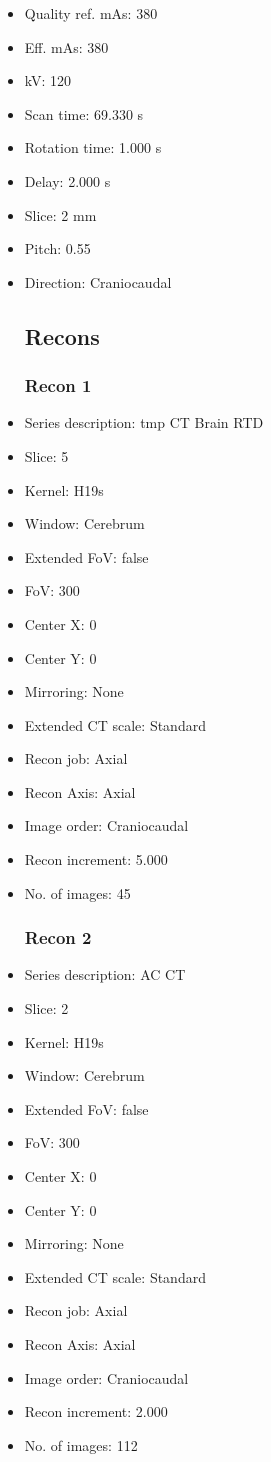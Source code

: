 \documentclass[12pt]{article}
\begin{document}
\begin{itemize}
\subsection{Scan}
\item Quality ref. mAs: 380\item Eff. mAs: 380\item kV: 120\item Scan time: 69.330 s\item Rotation time: 1.000 s\item Delay: 2.000 s\item Slice: 2 mm\item Pitch: 0.55\item Direction: Craniocaudal\subsection{Recons}

\subsubsection{Recon 1}
\item Series description: tmp CT Brain RTD
\item Slice: 5
\item Kernel: H19s
\item Window: Cerebrum
\item Extended FoV: false
\item FoV: 300
\item Center X: 0
\item Center Y: 0
\item Mirroring: None
\item Extended CT scale: Standard
\item Recon job: Axial
\item Recon Axis: Axial
\item Image order: Craniocaudal
\item Recon increment: 5.000
\item No. of images: 45
\subsubsection{Recon 2}
\item Series description: AC CT
\item Slice: 2
\item Kernel: H19s
\item Window: Cerebrum
\item Extended FoV: false
\item FoV: 300
\item Center X: 0
\item Center Y: 0
\item Mirroring: None
\item Extended CT scale: Standard
\item Recon job: Axial
\item Recon Axis: Axial
\item Image order: Craniocaudal
\item Recon increment: 2.000
\item No. of images: 112

\end{itemize}
\end{document}

